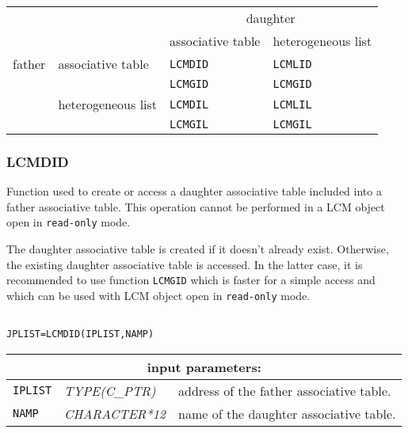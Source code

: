 \begin{center}
\begin{tabular}{|c|l|l|l|}
\cline{3-4}
\multicolumn{2}{c|}{} & \multicolumn{2}{c|}{daughter} \\
\cline{3-4}
\multicolumn{2}{c|}{} & associative table & heterogeneous list \\
\hline
father & associative table & {\tt LCMDID} & {\tt LCMLID} \\
       &                   & {\tt LCMGID} & {\tt LCMGID} \\
\cline{2-4}
       & heterogeneous list & {\tt LCMDIL} & {\tt LCMLIL} \\
       &                   & {\tt LCMGIL} & {\tt LCMGIL} \\
\hline
\end{tabular}
\end{center}

\subsubsection{LCMDID}

Function used to create or access a daughter associative table included into a father associative table. This operation cannot be
performed in a LCM object open in {\tt read-only} mode.

\vskip 0.2cm

The daughter associative table is created if it doesn't already exist. Otherwise, the
existing daughter associative table is accessed. In the latter case, it is recommended
to use function {\tt LCMGID} which is faster for a simple access and which can be used
with LCM object open in {\tt read-only} mode.

\begin{verbatim}

JPLIST=LCMDID(IPLIST,NAMP)
\end{verbatim}

\noindent
\begin{tabular}{|p{1.5cm}|p{3cm}|p{10cm}|}
\hline
\multicolumn{3}{|c|}{\bf input parameters:} \\
\hline
{\tt IPLIST} & {\it TYPE(C\_PTR)} & address of the father associative table. \\
\hline
{\tt NAMP} & {\it CHARACTER*12} & name of the daughter associative table. \\
\hline
\end{tabular}

\vskip 0.8cm

